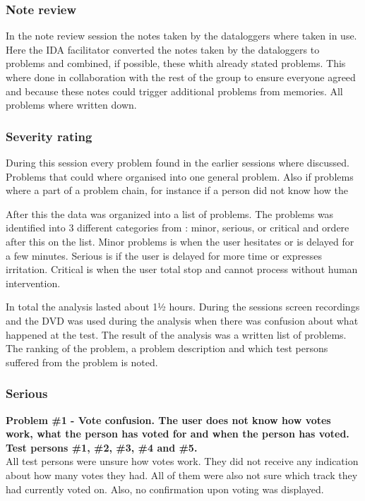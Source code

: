 \subsubsection{Note review}
In the note review session the notes taken by the dataloggers where taken in use. Here the IDA facilitator converted the notes taken by the dataloggers to problems and combined, if possible, these whith already stated problems. This where done in collaboration with the rest of the group to ensure everyone agreed and because these notes could trigger additional problems from memories. All problems where written down.

\subsubsection{Severity rating}
During this session every problem found in the earlier sessions where discussed. Problems that could where organised into one general problem. Also if problems where a part of a problem chain, for instance if a person did not know how the 
 
After this the data was organized into a list of problems. The problems was identified into 3 different categories from \cite{molich2007usable}: minor, serious, or critical and ordere after this on the list. Minor problems is when the user hesitates or is delayed for a few minutes. Serious is if the user is delayed for more time or expresses irritation. Critical is when the user total stop and cannot process without human intervention.

In total the analysis lasted about 1½ hours. During the sessions screen recordings and the DVD was used during the analysis when there was confusion about what happened at the test. The result of the analysis was a written list of problems. The ranking of the problem, a problem description and which test persons suffered from the problem is noted.

\subsubsection{Serious}
\textbf{Problem \#1 - Vote confusion. The user does not know how votes work, what the person has voted for and when the person has voted. Test persons \#1, \#2, \#3, \#4 and \#5.}\\
All test persons were unsure how votes work. They did not receive any indication about how many votes they had. All of them were also not sure which track they had currently voted on. Also, no confirmation upon voting was displayed.\\

